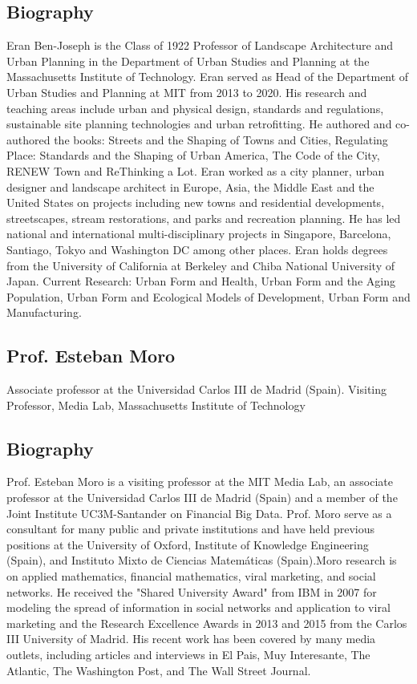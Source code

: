 \subsection*{Biography}
{Eran Ben-Joseph is the Class of 1922 Professor of Landscape Architecture and Urban Planning in the Department of Urban Studies and Planning at the Massachusetts Institute of Technology. Eran served as Head of the Department of Urban Studies and Planning at MIT from 2013 to 2020. His research and teaching areas include urban and physical design, standards and regulations, sustainable site planning technologies and urban retrofitting. He authored and co-authored the books: Streets and the Shaping of Towns and Cities, Regulating Place: Standards and the Shaping of Urban America, The Code of the City, RENEW Town and ReThinking a Lot. Eran worked as a city planner, urban designer and landscape architect in Europe, Asia, the Middle East and the United States on projects including new towns and residential developments, streetscapes, stream restorations, and parks and recreation planning. He has led national and international multi-disciplinary projects in Singapore, Barcelona, Santiago, Tokyo and Washington DC among other places. Eran holds degrees from the University of California at Berkeley and Chiba National University of Japan. Current Research: Urban Form and Health, Urban Form and the Aging Population, Urban Form and Ecological Models of Development, Urban Form and Manufacturing.}



\subsection*{Prof. Esteban Moro}

{Associate professor at the Universidad Carlos III de Madrid (Spain). Visiting Professor, Media Lab, Massachusetts Institute of Technology}
% 
\subsection*{Biography}
% 
{Prof. Esteban Moro is a visiting professor at the MIT Media Lab, an associate professor at the Universidad Carlos III de Madrid (Spain) and a member of the Joint Institute UC3M-Santander on Financial Big Data. Prof. Moro serve as a consultant for many public and private institutions and have held previous positions at the University of Oxford, Institute of Knowledge Engineering (Spain), and Instituto Mixto de Ciencias Matemáticas (Spain).Moro research is on applied mathematics, financial mathematics, viral marketing, and social networks. He received the "Shared University Award" from IBM in 2007 for modeling the spread of information in social networks and application to viral marketing and the Research Excellence Awards in 2013 and 2015 from the Carlos III University of Madrid. His recent work has been covered by many media outlets, including articles and interviews in El Pais, Muy Interesante, The Atlantic, The Washington Post, and The Wall Street Journal.}
